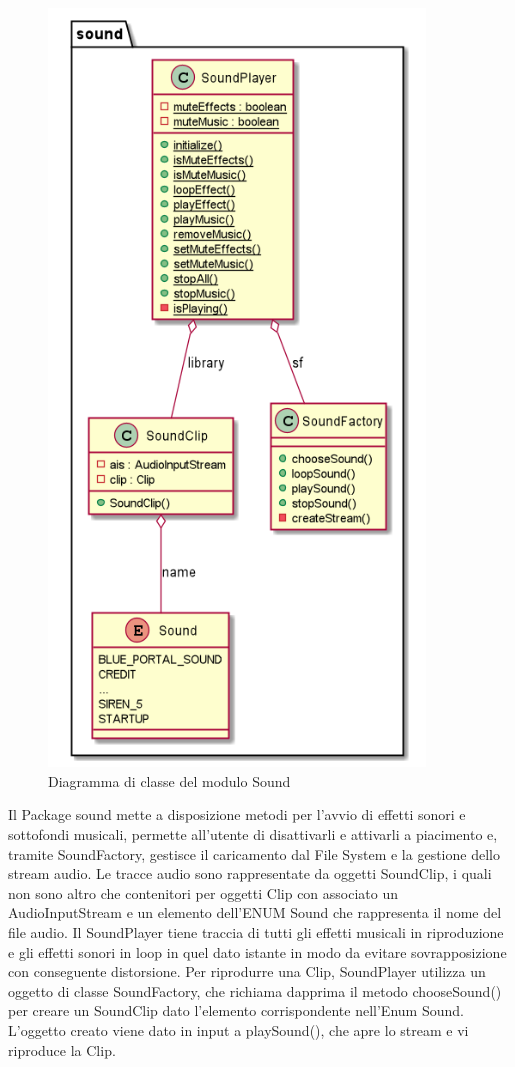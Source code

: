 \documentclass[12pt,a4paper]{report}
\begin{document}
\begin{figure}[tbp]
\begin{center}
  \includegraphics[width= 10cm]{sound}
\end{center}
  \caption{Diagramma di classe del modulo Sound}
  \label{fig:sound}
\end{figure}

Il Package sound mette a disposizione metodi per l’avvio di effetti sonori e sottofondi musicali, permette all’utente di disattivarli e attivarli a piacimento e, tramite SoundFactory, gestisce il caricamento dal File System e la gestione dello stream audio.
Le tracce audio sono rappresentate da oggetti SoundClip, i quali non sono altro che contenitori per oggetti Clip con associato un AudioInputStream e un elemento dell'ENUM Sound che rappresenta il nome del file audio.
Il SoundPlayer tiene traccia di tutti gli effetti musicali in riproduzione e gli effetti sonori in loop in quel dato istante in modo da evitare sovrapposizione con conseguente distorsione.
Per riprodurre una Clip, SoundPlayer utilizza un oggetto di classe SoundFactory, che richiama dapprima il metodo chooseSound() per creare un SoundClip dato l’elemento corrispondente nell’Enum Sound. L’oggetto creato viene dato in input a playSound(), che apre lo stream e vi riproduce la Clip.\newpage
\end{document}
